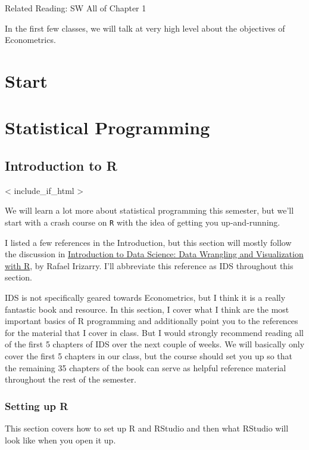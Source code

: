 \documentclass[
  letterpaper,
  DIV=11,
  numbers=noendperiod]{scrreprt}
\begin{document}
Related Reading: SW All of Chapter 1

In the first few classes, we will talk at very high level about the
objectives of Econometrics.

\part{Start}

\part{Statistical Programming}


\chapter{Introduction to R}\label{introduction-to-r}

{{< include_if_html >}}

We will learn a lot more about statistical programming this semester,
but we'll start with a crash course on \texttt{R} with the idea of
getting you up-and-running.

I listed a few references in the Introduction, but this section will
mostly follow the discussion in
\href{https://rafalab.dfci.harvard.edu/dsbook-part-1/}{Introduction to
Data Science: Data Wrangling and Visualization with R}, by Rafael
Irizarry. I'll abbreviate this reference as IDS throughout this section.

IDS is not specifically geared towards Econometrics, but I think it is a
really fantastic book and resource. In this section, I cover what I
think are the most important basics of R programming and additionally
point you to the references for the material that I cover in class. But
I would strongly recommend reading all of the first 5 chapters of IDS
over the next couple of weeks. We will basically only cover the first 5
chapters in our class, but the course should set you up so that the
remaining 35 chapters of the book can serve as helpful reference
material throughout the rest of the semester.

\section{Setting up R}\label{setting-up-r}

This section covers how to set up R and RStudio and then what RStudio
will look like when you open it up.
\end{document}
